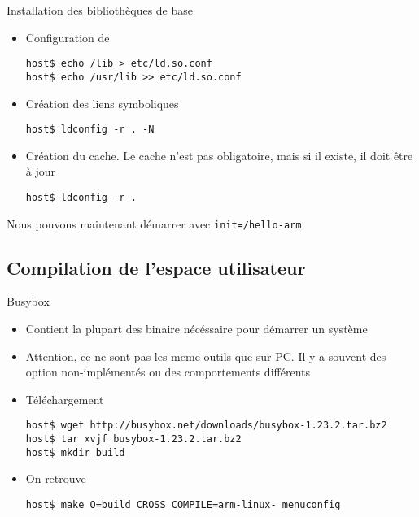 \begin{frame}[fragile=singleslide]{Installation des bibliothèques de base}
  \begin{itemize}
  \item Configuration de 
    \begin{lstlisting}
host$ echo /lib > etc/ld.so.conf
host$ echo /usr/lib >> etc/ld.so.conf
    \end{lstlisting}
  \item Création des liens symboliques
    \begin{lstlisting}
host$ ldconfig -r . -N
    \end{lstlisting}
  \item Création du cache. Le  cache n'est pas obligatoire, mais si il
    existe, il doit être à jour
    \begin{lstlisting}
host$ ldconfig -r .
    \end{lstlisting}
  \end{itemize}
  Nous pouvons maintenant démarrer avec \verb+init=/hello-arm+
\end{frame}

\subsection{Compilation de l'espace utilisateur}

\begin{frame}[fragile=singleslide]{Busybox}
  \begin{itemize}
  \item  Contient la plupart  des binaire  nécéssaire pour  démarrer un
    système
  \item Attention, ce ne  sont pas les meme outils que sur  PC. Il y a
    souvent des option non-implémentés ou des comportements différents
  \item Téléchargement
    \begin{lstlisting}
host$ wget http://busybox.net/downloads/busybox-1.23.2.tar.bz2
host$ tar xvjf busybox-1.23.2.tar.bz2
host$ mkdir build
    \end{lstlisting}
  \item On retrouve 
    \begin{lstlisting}
host$ make O=build CROSS_COMPILE=arm-linux- menuconfig
    \end{lstlisting}
  \end{itemize}
\end{frame}

